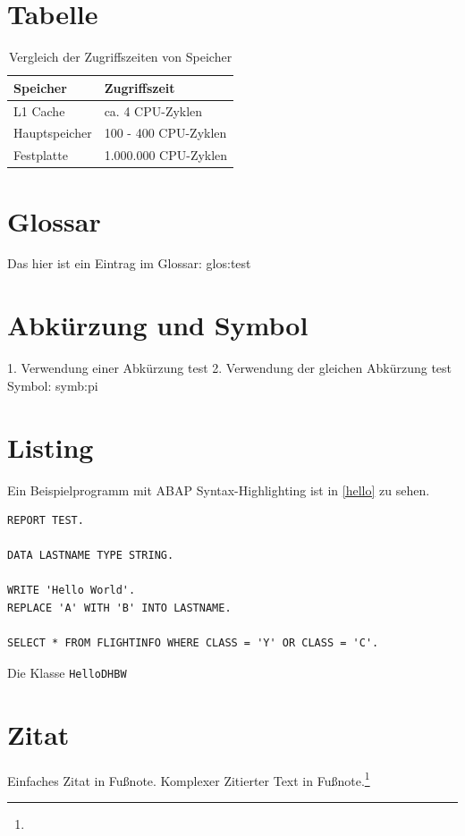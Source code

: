\section{Tabelle}

\begin{table}[htbp]%
\centering%
\begin{tabular}{| p{3cm} | p{5cm} |}
\hline
Speicher & Zugriffszeit \\
\hline
\hline
L1 Cache & ca. 4 CPU-Zyklen  \\ \hline
Hauptspeicher & 100 - 400 CPU-Zyklen \\ \hline
Festplatte & 1.000.000 CPU-Zyklen \\ \hline
\end{tabular} 
\caption[Vergleich der Zugriffszeiten von Speicher]{Vergleich der Zugriffszeiten von Speicher\label{table:zugriff}\protect \footnotemark}
\end{table}

\section{Glossar}
Das hier ist ein Eintrag im Glossar: \gls{glos:test}

\section{Abkürzung und Symbol}
1. Verwendung einer Abkürzung \gls{test}
2. Verwendung der gleichen Abkürzung \gls{test}
Symbol: \gls{symb:pi}

\section{Listing}
Ein Beispielprogramm mit ABAP Syntax-Highlighting ist in \vref{hello} zu sehen.

\begin{programm}[htbp]
\begin{lstlisting}
REPORT TEST.

DATA LASTNAME TYPE STRING.

WRITE 'Hello World'.
REPLACE 'A' WITH 'B' INTO LASTNAME.

SELECT * FROM FLIGHTINFO WHERE CLASS = 'Y' OR CLASS = 'C'.
\end{lstlisting}
\caption{Die Klasse \texttt{HelloDHBW}\label{hello}}
\end{programm}

\section{Zitat}
Einfaches Zitat in Fußnote. Komplexer Zitierter Text in Fußnote.\footnote{ }

